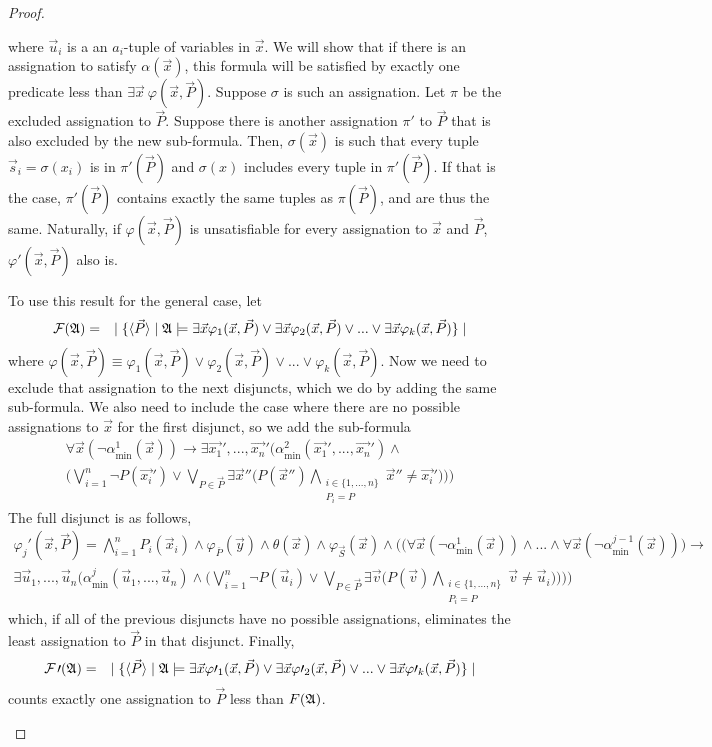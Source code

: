\documentclass[12pt]{article}
\def\A{{\frak A}}
\def\F{{\cal F}}
\def\P{\vec{P}}
\def\S{\vec{S}}
\def\s{\vec{s}}
\def\u{\vec{u}}
\def\v{\vec{v}}
\def\x{\vec{x}}
\begin{document}
\begin{proof}
\begin{enumerate}
where $\u_i$ is a an $a_i$-tuple of variables in $\x$. We will show that if there is an assignation to satisfy $\alpha(\x)$, this formula will be satisfied by exactly one predicate less than $\exists \x \: \varphi(\x,\P)$. Suppose $\sigma$ is such an assignation. Let $\pi$ be the excluded assignation to $\P$. Suppose there is another assignation $\pi\prime$ to $\P$ that is also excluded by the new sub-formula. Then, $\sigma(\x)$ is such that every tuple $\s_i = \sigma(x_i)$ is in $\pi\prime(\P)$ and $\sigma(x)$ includes every tuple in $\pi\prime(\P)$. If that is the case, $\pi\prime(\P)$ contains exactly the same tuples as $\pi(\P)$, and are thus the same. Naturally, if $\varphi(\x,\P)$ is unsatisfiable for every assignation to $\x$ and $\P$, $\varphi\prime(\x,\P)$ also is.

To use this result for the general case, let
\begin{eqnarray*}
\F(\A) &=& \mid \{ \langle\P\rangle \mid \A \models 
\exists \x \varphi_1(\x,\P) \vee
\exists \x \varphi_2(\x,\P) \vee
... \vee
\exists \x \varphi_k(\x,\P)
 \} \mid
\end{eqnarray*}
where $\varphi(\x,\P) \equiv \varphi_1(\x,\P) \vee \varphi_2(\x,\P) \vee ...  \vee \varphi_k(\x,\P) $. Now we need to exclude that assignation to the next disjuncts, which we do by adding the same sub-formula. We also need to include the case where there are no possible assignations to $\x$ for the first disjunct, so we add the sub-formula
\begin{multline*}
\forall\x\left(\neg\alpha^1_{\min}(\x)\right) \to \exists\vec{x_1}',...,\vec{x_n}'\Bigg(\alpha^2_{\min}(\vec{x_1}',...,\vec{x_n}') \wedge \\
\bigg(\bigvee_{i = 1}^{n}\neg P(\vec{x_i}') \vee \bigvee_{P\in\P} \exists \x''\Big( P(\x'') \bigwedge_{\substack{i\in\{1,...,n\} \\ P_i = P}} \x'' \neq \vec{x_i}'\Big) \bigg) \Bigg)
\end{multline*}
The full disjunct is as follows,
\begin{multline*}
\varphi_j\prime(\x,\P) = \bigwedge_{i=1}^n P_i(\x_i) \wedge \varphi_{\overline{P}}(\vec{y}) \wedge \theta(\x) \wedge \varphi_{\S}(\x) \wedge \Bigg(\Big(\forall\x\left(\neg\alpha^1_{\min}(\x)\right)\wedge ... \wedge \forall\x\left(\neg\alpha^{j-1}_{\min}(\x)\right)\Big) \to \\ 
\exists\u_1,...,\u_n\Bigg(\alpha^j_{\min}(\u_1,...,\u_n) \wedge
\bigg(\bigvee_{i = 1}^n\neg P(\u_i) \vee \bigvee_{P\in\P} \exists \v\Big( P(\v) \bigwedge_{\substack{i\in\{1,...,n\} \\ P_i = P}} \v \neq \u_i\Big) \bigg) \Bigg) \Bigg)
\end{multline*}
which, if all of the previous disjuncts have no possible assignations, eliminates the least assignation to $\P$ in that disjunct. Finally,
\begin{eqnarray*}
\F\prime(\A) &=& \mid \{ \langle\P\rangle \mid \A \models 
\exists \x \varphi\prime_1(\x,\P) \vee
\exists \x \varphi\prime_2(\x,\P) \vee
... \vee
\exists \x \varphi\prime_k(\x,\P)
 \} \mid
\end{eqnarray*}
counts exactly one assignation to $\P$ less than $F(\A)$.


\end{enumerate}
\end{proof}
\end{document}
